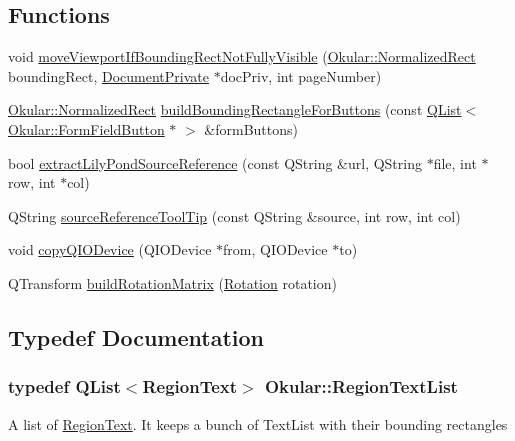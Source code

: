 \subsection*{Functions}
\begin{DoxyCompactItemize}
\item 
void \hyperlink{namespaceOkular_a1e0f22fec5a200bd3b1835b7bfd95172}{move\+Viewport\+If\+Bounding\+Rect\+Not\+Fully\+Visible} (\hyperlink{classOkular_1_1NormalizedRect}{Okular\+::\+Normalized\+Rect} bounding\+Rect, \hyperlink{classOkular_1_1DocumentPrivate}{Document\+Private} $\ast$doc\+Priv, int page\+Number)
\item 
\hyperlink{classOkular_1_1NormalizedRect}{Okular\+::\+Normalized\+Rect} \hyperlink{namespaceOkular_a3421c387b60db316a9ef570d16a2e7d0}{build\+Bounding\+Rectangle\+For\+Buttons} (const \hyperlink{classQList}{Q\+List}$<$ \hyperlink{classOkular_1_1FormFieldButton}{Okular\+::\+Form\+Field\+Button} $\ast$ $>$ \&form\+Buttons)
\item 
bool \hyperlink{namespaceOkular_ad195b608d5b6294feba9a4b095185d23}{extract\+Lily\+Pond\+Source\+Reference} (const Q\+String \&url, Q\+String $\ast$file, int $\ast$row, int $\ast$col)
\item 
Q\+String \hyperlink{namespaceOkular_ae289fc26cd6cac6abaa2fc5e3418c234}{source\+Reference\+Tool\+Tip} (const Q\+String \&source, int row, int col)
\item 
void \hyperlink{namespaceOkular_a862e1662eae79bca93b3d148ada9ad88}{copy\+Q\+I\+O\+Device} (Q\+I\+O\+Device $\ast$from, Q\+I\+O\+Device $\ast$to)
\item 
Q\+Transform \hyperlink{namespaceOkular_a1e3027987dae16ab546e4466e8b817a3}{build\+Rotation\+Matrix} (\hyperlink{namespaceOkular_a8556d00465f61ef533c6b027669e7da6}{Rotation} rotation)
\end{DoxyCompactItemize}


\subsection{Typedef Documentation}
\hypertarget{namespaceOkular_a870e45698d8c99f4400310d019c77861}{
\subsubsection[{Region\+Text\+List}]{\setlength{\rightskip}{0pt plus 5cm}typedef {\bf Q\+List}$<${\bf Region\+Text}$>$ {\bf Okular\+::\+Region\+Text\+List}}}\label{namespaceOkular_a870e45698d8c99f4400310d019c77861}
A list of \hyperlink{classRegionText}{Region\+Text}. It keeps a bunch of Text\+List with their bounding rectangles 

